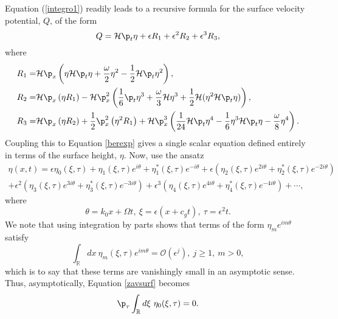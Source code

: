 \documentclass{JFM_Style/jfm}
\begin{document}
Equation (\ref{integro1}) readily leads to a recursive formula for the surface velocity potential, $Q$, of the form
\begin{equation}
Q = \mathcal{H}\p_{t}\eta + \epsilon R_{1} + \epsilon^{2} R_{2} + \epsilon^{3} R_{3},
\label{Qexp}
\end{equation}
where
\begin{align*}
R_{1}= & \mathcal{H}\p_{x}\left(\eta\mathcal{H}\p_{t}\eta+ \frac{\omega}{2}\eta^{2} - \frac{1}{2}\mathcal{H}\p_{t}\eta^{2} \right),\\
R_{2}= & \mathcal{H}\p_{x}\left(\eta R_{1} \right) - \mathcal{H}\p_{x}^{2}\left(\frac{1}{6}\p_{t}\eta^{3} + \frac{\omega}{3}\mathcal{H}\eta^{3} + \frac{1}{2}\mathcal{H}(\eta^{2}\mathcal{H}\p_{t}\eta)\right),\\
R_{3} = & \mathcal{H}\p_{x}\left(\eta R_{2} \right) + \frac{1}{2}\p_{x}^{2}\left(\eta^{2}R_{1}\right) + \mathcal{H}\p_{x}^{3}\left(\frac{1}{24}\mathcal{H}\p_{t}\eta^{4} - \frac{1}{6}\eta^{3}\mathcal{H}\p_{t}\eta - \frac{\omega}{8}\eta^{4}\right).
\end{align*}
Coupling this to Equation \eqref{berexp} gives a single scalar equation defined entirely in terms of the surface height, $\eta$.  Now, use the ansatz
\begin{multline}
\eta(x,t) = \epsilon \eta_{0}(\xi,\tau) + \eta_{1}(\xi,\tau)e^{i\theta} +  \eta_{1}^{\ast}(\xi,\tau)e^{-i\theta} + \epsilon\left(\eta_{2}(\xi,\tau)e^{2i\theta} +  \eta_{2}^{\ast}(\xi,\tau)e^{-2i\theta}\right) \\
+ \epsilon^{2}\left(\eta_{3}(\xi,\tau)e^{3i\theta} +  \eta_{3}^{\ast}(\xi,\tau)e^{-3i\theta}\right)  + \epsilon^{3}\left(\eta_{4}(\xi,\tau)e^{4i\theta} +  \eta_{4}^{\ast}(\xi,\tau)e^{-4i\theta}\right) + \cdots,
\label{nlssurfexp}
\end{multline}
where
\begin{equation}
\theta = k_{0}x + \Omega t, ~ \xi = \epsilon(x + c_{g}t), ~ \tau = \epsilon^{2}t.
\label{xidef}
\end{equation}
We note that using integration by parts shows that terms of the form $\eta_{m}e^{im\theta}$ satisfy
\[
\int_{\mathbb{R}} dx ~ \eta_{m}(\xi,\tau) e^{im\theta}  = \mathcal{O}(\epsilon^{j}), ~ j\geq 1,~ m>0,
\]
which is to say that these terms are vanishingly small in an asymptotic sense.  Thus, asymptotically, Equation \eqref{zavsurf} becomes
\begin{equation}
\p_{\tau}\int_{\mathbb{R}} d\xi ~ \eta_{0}(\xi,\tau) = 0.
\label{zavzmean}
\end{equation}
\end{document}
